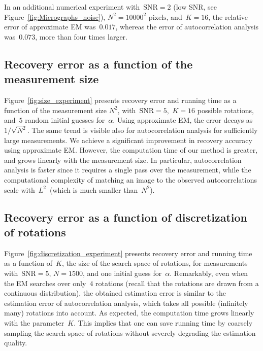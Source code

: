 \documentclass{article}
\begin{document}
In an additional numerical experiment with~$\text{SNR} = 2$ (low SNR, see Figure~\ref{fig:Micrographs_noise}), $N^2 = 10000^2 \text{ pixels}$, and~\mbox{$K = 16$}, the relative error of approximate EM was~$\text{0.017}$, whereas the error of autocorrelation analysis was~$0.073$, more than four times larger.

\subsection{Recovery error as a function of the measurement size}
\label{subsec:exp_size}
Figure~\ref{fig:size_experiment} presents recovery error and running time as a function of the measurement size $N^2$, with~\mbox{$\text{SNR} = 5$},~\mbox{$K = 16$} possible rotations, and~$5$ random initial guesses for~$\alpha$. Using approximate EM, the error decays \mbox{as~$1 / \sqrt{N^2}$}. The same trend is visible also for autocorrelation analysis for sufficiently large measurements. We achieve a significant improvement in recovery accuracy using approximate EM. However, the computation time of our method is greater, and grows linearly with the measurement size. In particular, autocorrelation analysis is faster since it requires a single pass over the measurement, while the computational complexity of matching an image to the observed autocorrelations scale with~$L^2$~(which is much smaller than~$N^2$).

\subsection{Recovery error as a function of discretization of rotations}
\label{subsec:exp_discretization}
Figure~\ref{fig:discretization_experiment} presents recovery error and running time as a function of~$K$, the size of the search space of rotations, for measurements with~\mbox{$\text{SNR} = 5$}, $N = 1500$, and one  initial guess for~$\alpha$. %
Remarkably, even when the EM searches over only~$4$ rotations (recall that the rotations are drawn from a continuous distribution), the obtained estimation error is similar to the estimation error of autocorrelation analysis, which takes all possible (infinitely many) rotations into account. As expected, the computation time grows linearly with the parameter~$K$. This implies that one can save running time by coarsely sampling  the search space of rotations without severely degrading  the estimation quality.
\end{document}
